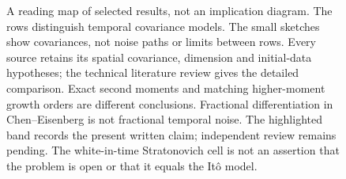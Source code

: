 \begin{figure}
  \centering
  
  \caption[Selected moment results by noise model]{A reading map of selected results, not an implication diagram.
    The rows distinguish temporal covariance models. The small sketches show
    covariances, not noise paths or limits between rows. Every
    source retains its spatial covariance, dimension and initial-data hypotheses;
    the technical literature review gives the detailed comparison. Exact second
    moments and matching higher-moment growth orders are different conclusions.
    Fractional differentiation in Chen--Eisenberg is not fractional temporal
    noise. The highlighted band records the present written claim; independent review
    remains pending. The white-in-time Stratonovich cell is not an
    assertion that the problem is open or that it equals the It\^o model.}
  \label{Fig:literature-reader-map}
\end{figure}

